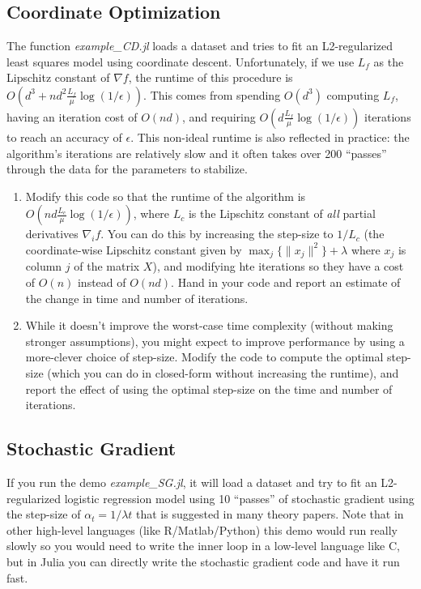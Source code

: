 \documentclass{article}
\def\blu#1{{\color{blu}#1}}
\def\norm#1{\|#1\|}
\def\enum#1{\begin{enumerate}#1\end{enumerate}}
\begin{document}
\subsection{Coordinate Optimization}

The function \emph{example\_CD.jl} loads a dataset and tries to fit an L2-regularized least squares model using coordinate descent. Unfortunately, if we use $L_f$ as the Lipschitz constant of $\nabla f$, the runtime of this procedure is $O(d^3 + nd^2\frac{L_f}{\mu}\log(1/\epsilon))$. This comes from spending $O(d^3)$ computing $L_f$, having an iteration cost of $O(nd)$, and requiring $O(d\frac{L_f}{\mu}\log(1/\epsilon))$ iterations to reach an accuracy of $\epsilon$. This non-ideal runtime is also reflected in practice: the algorithm's iterations are relatively slow and it often takes over 200 ``passes'' through the data for the parameters to stabilize.

\enum{
\item Modify this code so that the runtime of the algorithm is $O(nd\frac{L_c}{\mu}\log(1/\epsilon))$, where $L_c$ is the Lipschitz constant of \emph{all} partial derivatives $\nabla_i f$. You can do this by increasing the step-size to $1/L_c$ (the coordinate-wise Lipschitz constant given by $\max_j\{\norm{x_j}^2\} + \lambda$ where $x_j$ is column $j$ of the matrix $X$), and modifying hte iterations so they have a cost of $O(n)$ instead of $O(nd)$.
 \blu{Hand in your code and report an estimate of the change in time and number of iterations}.
 \item While it doesn't improve the worst-case time complexity (without making stronger assumptions), you might expect to improve performance by using a more-clever choice of step-size. \blu{Modify the code to compute the optimal step-size (which you can do in closed-form without increasing the runtime), and report the effect of using the optimal step-size on the time and number of iterations.}
}



\subsection{Stochastic Gradient}

If you run the demo \emph{example\_SG.jl}, it will load a dataset and try to fit an L2-regularized logistic regression model using 10 ``passes'' of stochastic gradient using the step-size of $\alpha_t = 1/\lambda t$ that is suggested in many theory papers. Note that in other high-level languages (like R/Matlab/Python) this demo would run really slowly so you would need to write the inner loop in a low-level language like C, but in Julia you can directly write the stochastic gradient code and have it run fast.
\end{document}
